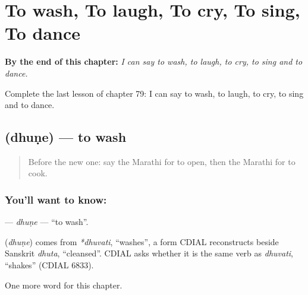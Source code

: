 
\chapter{To wash, To laugh, To cry, To sing, To dance}
\label{ch:mr-to-wash-to-laugh-to-cry-to-sing-to-dance}

\begin{chapteropening}
\textbf{By the end of this chapter:} \emph{I can say to wash, to laugh, to cry, to sing and to dance.}

Complete the last lesson of chapter 79: I can say to wash, to laugh, to cry, to sing and to dance.
\end{chapteropening}

\section[\texorpdfstring{\mr{धुणे} (dhuṇe)}{धुणे (dhuṇe)}]{ (dhuṇe) — to wash}

\label{lesson:MR-C79-dhune}



\begin{quote}
Before the new one: say the Marathi for to open, then the Marathi for to cook.
\end{quote}

\subsection*{You'll want to know: }
\textbf{} — \emph{dhuṇe} — \textquotedblleft{}to wash\textquotedblright{}.

\begin{cousinweb}
\textbf{} (\emph{dhuṇe}) comes from \emph{*dhuvati}, \textquotedblleft{}washes\textquotedblright{}, a form CDIAL reconstructs beside Sanskrit \emph{dhuta}, \textquotedblleft{}cleansed\textquotedblright{}. CDIAL asks whether it is the same verb as \emph{dhuvati}, \textquotedblleft{}shakes\textquotedblright{} (CDIAL 6833).
\end{cousinweb}

\begin{grammarlens}[title={What you've built}]
One more word for this chapter.
\end{grammarlens}

